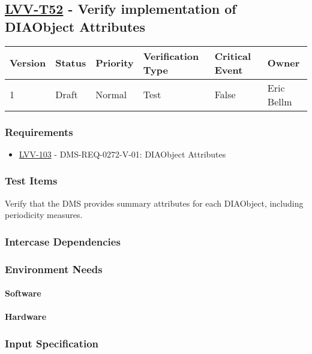 \subsection{\href{https://jira.lsstcorp.org/secure/Tests.jspa\#/testCase/LVV-T52}{LVV-T52}
    - Verify implementation of DIAObject Attributes}\label{lvv-t52}

\begin{longtable}[]{llllll}
\toprule
Version & Status & Priority & Verification Type & Critical Event & Owner
\\\midrule
1 & Draft & Normal &
Test & False & Eric Bellm
\\\bottomrule
\end{longtable}

\subsubsection{Requirements}
\begin{itemize}
\item \href{https://jira.lsstcorp.org/browse/LVV-103}{LVV-103} - DMS-REQ-0272-V-01: DIAObject Attributes
\end{itemize}

\subsubsection{Test Items}
Verify that the DMS provides summary attributes for each DIAObject,
including periodicity measures.



\subsubsection{Intercase Dependencies}

\subsubsection{Environment Needs}

\paragraph{Software}

\paragraph{Hardware}

\subsubsection{Input Specification}

